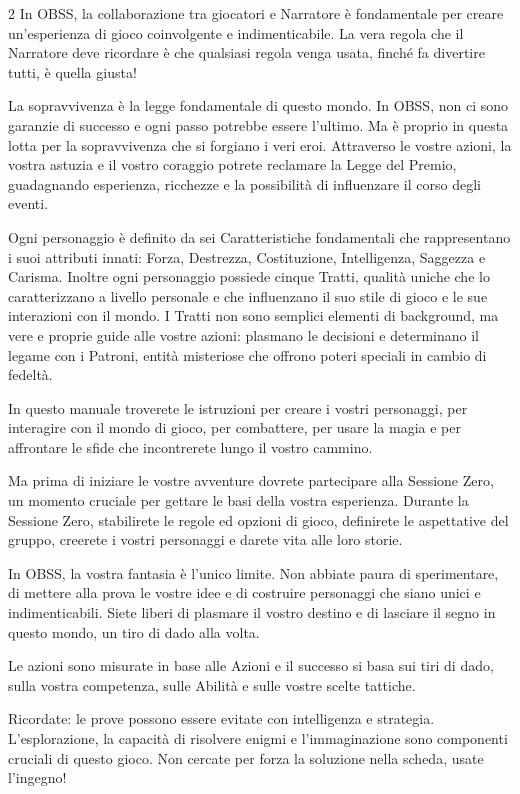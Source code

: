 \begin{multicols}{2}
In OBSS, la collaborazione tra giocatori e Narratore è fondamentale per creare un’esperienza di gioco coinvolgente e indimenticabile.
La vera regola che il Narratore deve ricordare è che qualsiasi regola venga usata, finché fa divertire tutti, è quella giusta!

La sopravvivenza è la legge fondamentale di questo mondo. In OBSS, non ci sono garanzie di successo e ogni passo potrebbe essere l'ultimo. Ma è proprio in questa lotta per la sopravvivenza che si forgiano i veri eroi. Attraverso le vostre azioni, la vostra astuzia e il vostro coraggio potrete reclamare la Legge del Premio, guadagnando esperienza, ricchezze e la possibilità di influenzare il corso degli eventi.

Ogni personaggio è definito da sei Caratteristiche fondamentali che rappresentano i suoi attributi innati: Forza, Destrezza, Costituzione, Intelligenza, Saggezza e Carisma. Inoltre ogni personaggio possiede cinque Tratti, qualità uniche che lo caratterizzano a livello personale e che influenzano il suo stile di gioco e le sue interazioni con il mondo. I Tratti non sono semplici elementi di background, ma vere e proprie guide alle vostre azioni: plasmano le decisioni e determinano il legame con i Patroni, entità misteriose che offrono poteri speciali in cambio di fedeltà.

In questo manuale troverete le istruzioni per creare i vostri personaggi, per interagire con il mondo di gioco, per combattere, per usare la magia e per affrontare le sfide che incontrerete lungo il vostro cammino.

Ma prima di iniziare le vostre avventure dovrete partecipare alla Sessione Zero, un momento cruciale per gettare le basi della vostra esperienza. Durante la Sessione Zero, stabilirete le regole ed opzioni di gioco, definirete le aspettative del gruppo, creerete i vostri personaggi e darete vita alle loro storie.

In OBSS, la vostra fantasia è l'unico limite. Non abbiate paura di sperimentare, di mettere alla prova le vostre idee e di costruire personaggi che siano unici e indimenticabili. Siete liberi di plasmare il vostro destino e di lasciare il segno in questo mondo, un tiro di dado alla volta.

Le azioni sono misurate in base alle Azioni e il successo si basa sui tiri di dado, sulla vostra competenza, sulle Abilità e sulle vostre scelte tattiche.

Ricordate: le prove possono essere evitate con intelligenza e strategia. L'esplorazione, la capacità di risolvere enigmi e l'immaginazione sono componenti cruciali di questo gioco. Non cercate per forza la soluzione nella scheda, usate l'ingegno!


\end{multicols}
